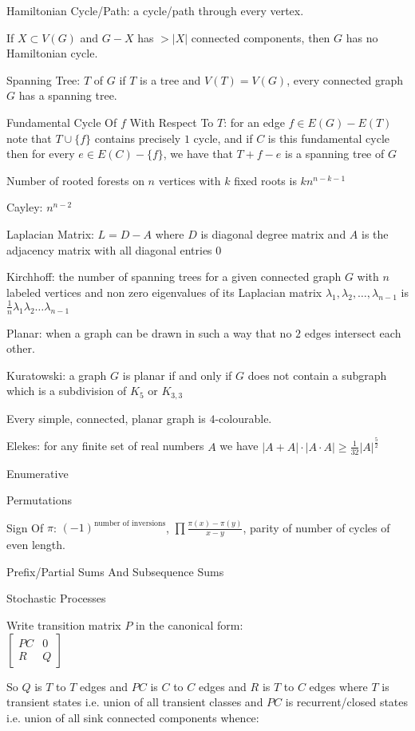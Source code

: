 Hamiltonian Cycle/Path: a cycle/path through every vertex.

If $X \subset V(G)$ and $G-X$ has $> |X|$ connected components, then $G$ has no Hamiltonian cycle.

Spanning Tree: $T$ of $G$ if $T$ is a tree and $V(T)=V(G)$, every connected graph $G$ has a spanning tree.

Fundamental Cycle Of $f$ With Respect To $T$: for an edge $f \in E(G)-E(T)$ note that $T \cup \{f \}$ contains precisely $1$ cycle, and if $C$ is this fundamental cycle then for every $e \in E(C) - \{ f \}$, we have that $T+f-e$ is a spanning tree of $G$

Number of rooted forests on $n$ vertices with $k$ fixed roots is $kn^{n-k-1}$

Cayley: $n^{n-2}$

Laplacian Matrix: $L=D-A$ where $D$ is diagonal degree matrix and $A$ is the adjacency matrix with all diagonal entries $0$

Kirchhoff: the number of spanning trees for a given connected graph $G$ with $n$ labeled vertices and non zero eigenvalues of its Laplacian matrix $\lambda_1, \lambda_2, \dots, \lambda_{n-1}$ is $\frac{1}{n} \lambda_1 \lambda_2 \dots \lambda_{n-1}$

Planar: when a graph can be drawn in such a way that no $2$ edges intersect each other.

Kuratowski: a graph $G$ is planar if and only if $G$ does not contain a subgraph which is a subdivision of $K_5$ or $K_{3,3}$

Every simple, connected, planar graph is $4$-colourable.

Elekes: for any finite set of real numbers $A$ we have $|A+A| \cdot |A \cdot A| \ge \frac{1}{32} |A|^{\frac{5}{2}}$

Enumerative

Permutations

Sign Of $\pi$: $(-1)^{\text{number of inversions}}$, $\prod \frac{\pi(x)-\pi(y)}{x-y}$, parity of number of cycles of even length.

Prefix/Partial Sums And Subsequence Sums

Stochastic Processes

Write transition matrix $P$ in the canonical form: \\
$\begin{bmatrix}
PC & 0 \\
R & Q
\end{bmatrix}$

So $Q$ is $T$ to $T$ edges and $PC$ is $C$ to $C$ edges and $R$ is $T$ to $C$ edges where $T$ is transient states i.e. union of all transient classes and $PC$ is recurrent/closed states i.e. union of all sink connected components whence:

